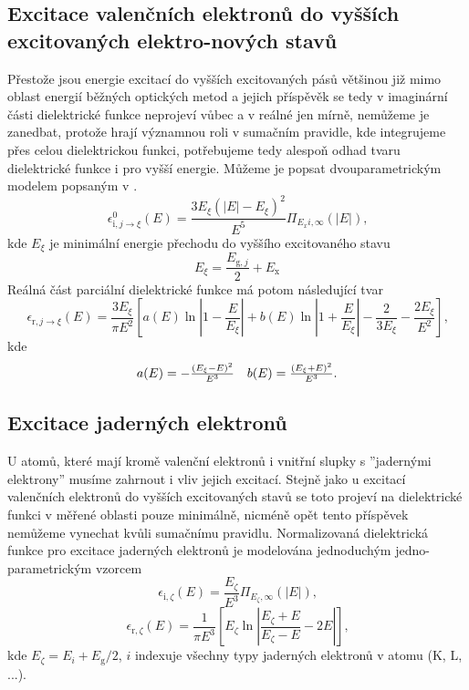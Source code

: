 \subsection{Excitace valenčních elektronů do vyšších excitovaných elektro-nových stavů}
Přestože jsou energie excitací do vyšších excitovaných pásů většinou již mimo oblast energií běžných optických metod a jejich příspěvěk se tedy v imaginární části dielektrické funkce neprojeví vůbec a v reálné jen mírně, nemůžeme je zanedbat, protože hrají významnou roli v sumačním pravidle, kde integrujeme přes celou dielektrickou funkci, potřebujeme tedy alespoň odhad tvaru dielektrické funkce i pro vyšší energie. 
Můžeme je popsat dvouparametrickým modelem popsaným v \cite{sumrule}.
\begin{equation}
\epsilon_{\mathrm{i}, j \rightarrow \xi}^0(E) = \frac{3 E_\xi(|E| - E_\xi)^2}{E^5} \Pi_{E_xi, \infty}(|E|) \text{,}
\end{equation}
kde $E_\xi$ je minimální energie přechodu do vyššího excitovaného stavu
\begin{equation}
E_\xi = \frac{E_{\mathrm{g},j}}{2} + E_\mathrm{x}
\end{equation}
Reálná část parciální dielektrické funkce má potom následující tvar
\begin{equation}
\epsilon_{\mathrm{r}, j \rightarrow \xi}(E) = 
\frac{3E_\xi}{\pi E^2}
\left[
	a(E) \ln\left|1-\frac{E}{E_\xi}\right|
	+ b(E) \ln\left|1 + \frac{E}{E_\xi}\right|
	- \frac{2}{3E_\xi} - \frac{2E_\xi}{E^2}
\right] \text{,}
\end{equation}
kde
\begin{equation}
\begin{array}{c c}
a(E) = -\frac{(E_\xi - E)^2}{E^3} &
b(E) = \frac{(E_\xi + E)^2}{E^3} \text{.}\\
\end{array}
\end{equation}


\subsection{Excitace jaderných elektronů}
U atomů, které mají kromě valenční elektronů i vnitřní slupky s ''jadernými elektrony'' musíme zahrnout i vliv jejich excitací. Stejně jako u excitací valenčních elektronů do vyšších excitovaných stavů se toto projeví na dielektrické funkci v měřené oblasti pouze minimálně, nicméně opět tento příspěvek nemůžeme vynechat kvůli sumačnímu pravidlu. Normalizovaná dielektrická funkce pro excitace jaderných elektronů je modelována jednoduchým jedno-parametrickým vzorcem \cite{sumrule2}
\begin{equation}
\epsilon_{\mathrm{i},\zeta}(E) = \frac{E_\zeta}{E^3} \Pi_{E_\zeta,\infty}(|E|) \text{,}
\end{equation}
\begin{equation}
\epsilon_{\mathrm{r},\zeta}(E) = \frac{1}{\pi E^3}\left[ E_\zeta \ln\left| \frac{E_\zeta + E}{E_\zeta - E} - 2E\right| \right] \text{,}
\end{equation}
kde $E_\zeta = E_i + E_\mathrm{g}/2$, $i$ indexuje všechny typy jaderných elektronů v atomu (K, L, ...). 

